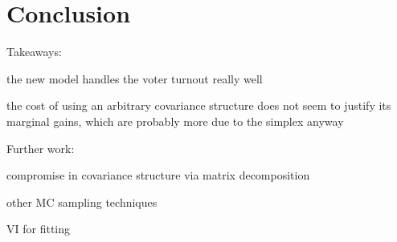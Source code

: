\documentclass{article}
\begin{document}
\section{Conclusion} \label{sec:conclusion}

Takeaways:
\benum
  \item the new model handles the voter turnout really well
  \item the cost of using an arbitrary covariance structure does not seem to justify its marginal gains, which are probably more due to the simplex anyway
\eenum

Further work:
\benum
  \item compromise in covariance structure via matrix decomposition
  \item other MC sampling techniques
  \item VI for fitting
\eenum




\clearpage
\small


\end{document}
